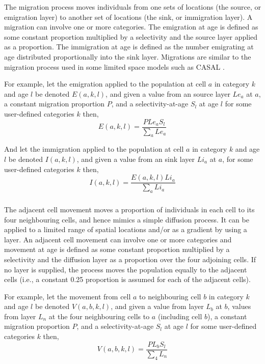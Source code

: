 The migration process moves individuals from one sets of locations (the source, or emigration layer) to another set of locations (the sink, or immigration layer). A migration can involve one or more categories. The emigration at age is defined as some constant proportion multiplied by a selectivity and the source layer applied as a proportion. The immigration at age is defined as the number emigrating at age distributed proportionally into the sink layer. Migrations are similar to the migration process used in some limited space models such as CASAL \citep{1388}.

For example, let the emigration applied to the population at cell $a$ in category $k$ and age $l$ be denoted $E(a,k,l)$, and given a value from an source layer $Le_a$  at $a$, a constant migration proportion $P$, and a selectivity-at-age $S_l$ at age $l$ for some user-defined categories $k$ then, 
\begin{equation}
  E(a,k,l) = \frac{P Le_a S_l }{\sum\limits_a Le_a}
\end{equation}

And let the immigration applied to the population at cell $a$ in category $k$ and age $l$ be denoted $I(a,k,l)$, and given a value from an sink layer $Li_a$  at $a$, for some user-defined categories $k$ then, 
\begin{equation}
  I(a,k,l) = \frac{E(a,k,l) Li_a }{\sum\limits_a Li_a} 
\end{equation}

\subsubsection{}

The adjacent cell movement moves a proportion of individuals in each cell to its four neighbouring cells, and hence mimics a simple diffusion process. It can be applied to a limited range of spatial locations and/or as a gradient by using a layer. An adjacent cell movement can involve one or more categories and movement at age is defined as some constant proportion multiplied by a selectivity and the diffusion layer as a proportion over the four adjoining cells. If no layer is supplied, the process moves the population equally to the adjacent cells (i.e., a constant 0.25 proportion is assumed for each of the adjacent cells).

For example, let the movement from cell $a$ to neighbouring cell $b$ in category $k$ and age $l$ be denoted $V(a,b,k,l)$, and given a value from layer $L_b$  at $b$, values from layer $L_n$ at the four neighbouring cells to $a$ (including cell $b$), a constant migration proportion $P$, and a selectivity-at-age $S_l$ at age $l$ for some user-defined categories $k$ then, 
\begin{equation}
  V(a,b,k,l) = \frac{P L_b S_l }{\sum\limits_4 L_n}
\end{equation}

